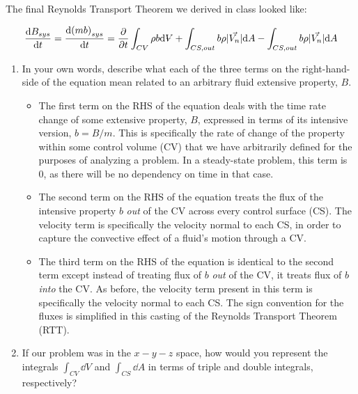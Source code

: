 \documentclass[../main.tex]{subfiles}
\begin{document}

The final Reynolds Transport Theorem we derived in class looked like:

\begin{equation*}
    \frac{\dd B_{sys}}{\dd t} = %
    \frac{\dd (mb)_{sys}}{\dd t} = %
    \pdv{t} \int_{CV} \rho b \dd \volume +%
    \int_{CS,out} b \rho \lvert{\vec{V_n}}\rvert \dd A -%
    \int_{CS,out} b \rho \lvert{\vec{V_n}}\rvert \dd A
\end{equation*}

\begin{enumerate}[label = (\alph*)]

    \item In your own words, describe what each of the three terms on the right-hand-side of the equation mean related to an arbitrary fluid extensive property, $B$.

        \begin{itemize}

            \item The first term on the RHS of the equation deals with the time rate change of some extensive property, $B$, expressed in terms of its intensive version, $b = B/m$.
            This is specifically the rate of change of the property within some control volume (CV) that we have arbitrarily defined for the purposes of analyzing a problem.
            In a steady-state problem, this term is 0, as there will be no dependency on time in that case.
            \item The second term on the RHS of the equation treats the flux of the intensive property $b$ \textit{out} of the CV across every control surface (CS).
            The velocity term is specifically the velocity normal to each CS, in order to capture the convective effect of a fluid's motion through a CV.
            \item The third term on the RHS of the equation is identical to the second term except instead of treating flux of $b$ \textit{out} of the CV, it treats flux of $b$ \textit{into} the CV.
            As before, the velocity term present in this term is specifically the velocity normal to each CS. 
            The sign convention for the fluxes is simplified in this casting of the Reynolds Transport Theorem (RTT).

        \end{itemize}

    \item If our problem was in the $x-y-z$ space, how would you represent the integrals \(\int_{CV} \dd V\) and \(\int_{CS} \dd A\) in terms of triple and double integrals, respectively?
    

\end{enumerate}
\end{document}
